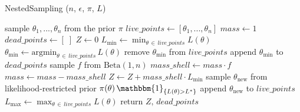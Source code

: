 \documentclass[12pt, a4paper]{report}
\begin{document}
\begin{algorithm}
    \caption[The basic Nested Sampling algorithm.]{NestedSampling ($n$, $\epsilon$, $\pi$, $L$)}
    \label{alg:nested_sampling}
    \begin{algorithmic}
        \State sample $\theta_1, ..., \theta_n$ from the prior $\pi$
        \State $live\_points \gets [ \theta_1, ..., \theta_n ]$
        \State $mass \gets 1$
        \State $dead\_points \gets [ \; ]$
        \State $Z \gets 0$
        \Repeat
            \State $L_{\textrm{min}} \gets \min_{\theta \, \in \, live\_points} L(\theta)$ 
            \State $\theta_{\textrm{min}} \gets \textrm{argmin}_{\theta \, \in \, live\_points} \, L(\theta)$
            \State remove $\theta_{\textrm{min}}$ from $live\_points$
            \State append $\theta_{\textrm{min}}$ to $dead\_points$
            \State sample $f$ from  $\textrm{Beta}(1, n)$
            \State $mass\_shell \gets mass \cdot f$
            \State $mass \gets mass - mass\_shell$
            \State $Z \gets Z + mass\_shell \cdot L_{\textrm{min}}$
            \State sample $\theta_{\textrm{new}}$ from likelihood-restricted prior $\pi(\theta) \, \mathbbm{1}_{\{L(\theta) > L^*\}}$
            \State append $\theta_{\textrm{new}}$ to $live\_points$
            \State $L_{\textrm{max}} \gets \max_{\theta \, \in \, live\_points} L(\theta)$
        \State return $Z,\, dead\_points$
    \end{algorithmic}
\end{algorithm}
\end{document}
